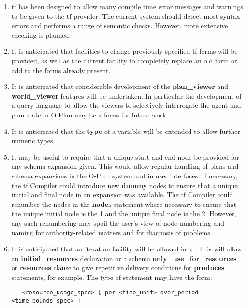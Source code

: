 \begin{enumerate}

\item {\sc tf} has been designed to allow many compile time error
messages and warnings to be given to the {\sc tf} provider.  The
current system should detect most syntax errors and performs a
range of semantic checks.  However, more extensive checking is
planned.

\item It is anticipated that facilities to change previously
specified {\sc tf} forms will be provided, as well as the current facility
to completely replace an old form or add to the forms already present.

\item It is anticipated that considerable development of the {\bf
plan\_viewer} and {\bf world\_viewer} features will be undertaken.  In
particular the development of a query language to allow the viewers to
selectively interrogate the agent and plan state in O-Plan may be a focus for
future work.

\item It is anticipated that the {\bf type} of a variable will
be extended to allow further numeric types.

\item It may be useful to require that a unique start and end node be provided
for any schema expansion given.  This would allow regular handling of plans
and schema expansions in the O-Plan system and in user interfaces.  If
necessary, the {\sc tf} Compiler could introduce new {\bf dummy} nodes to
ensure that a unique initial and final node in an expansion was available.
The {\sc tf} Compiler could renumber the nodes in the {\bf nodes} statement
where necessary to ensure that the unique initial node is the
 1 and the unique final node is the  2.
However, any such renumbering may spoil the user's view of node numbering and
naming for authority-related matters and for diagnosis of problems.

\item It is anticipated that an iteration facility will be allowed in a
.  This will allow an {\bf initial\_resources}
declaration or a schema {\bf only\_use\_for\_resources} or {\bf resources}
clause to give repetitive delivery conditions for {\bf produces} statements,
for example.  The type of statement may have the form:
\begin{verbatim}
   <resource_usage_spec> [ per <time_unit> over_period <time_bounds_spec> ]
\end{verbatim}


\end{enumerate}
